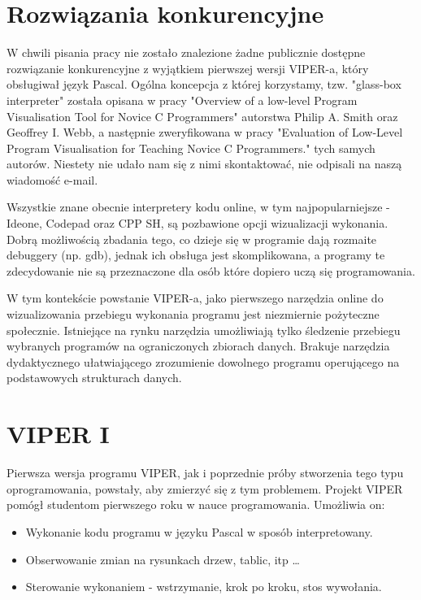 \documentclass[a4paper,twoside,openright,11pt]{report}
\begin{document}
  \chapter{Rozwiązania konkurencyjne}
\par W chwili pisania pracy nie zostało znalezione żadne publicznie dostępne rozwiązanie konkurencyjne z wyjątkiem pierwszej wersji VIPER-a, który obsługiwał język Pascal. Ogólna koncepcja z której korzystamy, tzw. "glass-box interpreter" została opisana w pracy "Overview of a low-level Program Visualisation Tool for Novice C Programmers" autorstwa Philip A. Smith oraz Geoffrey I. Webb, a następnie zweryfikowana w pracy "Evaluation of Low-Level Program Visualisation for Teaching Novice C Programmers." tych samych autorów. Niestety nie udało nam się z nimi skontaktować, nie odpisali na naszą wiadomość e-mail.
\par Wszystkie znane obecnie interpretery kodu online, w tym najpopularniejsze - Ideone, Codepad oraz CPP SH, są pozbawione opcji wizualizacji wykonania. Dobrą możliwością zbadania tego, co dzieje się w programie dają rozmaite debuggery (np. gdb), jednak ich obsługa jest skomplikowana, a programy te zdecydowanie nie są przeznaczone dla osób które dopiero uczą się programowania.
\par W tym kontekście powstanie VIPER-a, jako pierwszego narzędzia online do wizualizowania przebiegu wykonania programu jest niezmiernie pożyteczne społecznie. Istniejące na rynku narzędzia umożliwiają tylko śledzenie przebiegu wybranych programów na ograniczonych zbiorach danych. Brakuje narzędzia dydaktycznego ułatwiającego zrozumienie dowolnego programu operującego na podstawowych strukturach danych. 

  \chapter{VIPER I}
\par Pierwsza wersja programu VIPER, jak i poprzednie próby stworzenia tego typu oprogramowania, powstały, aby zmierzyć się z tym problemem. Projekt VIPER pomógł studentom pierwszego roku w nauce programowania. Umożliwia on:
\begin{itemize}

  \item Wykonanie kodu programu w języku Pascal w sposób interpretowany.
  \item Obserwowanie zmian na rysunkach drzew, tablic, itp \ldots
  \item Sterowanie wykonaniem - wstrzymanie, krok po kroku, stos wywołania.

\end{itemize}
 
\end{document}
